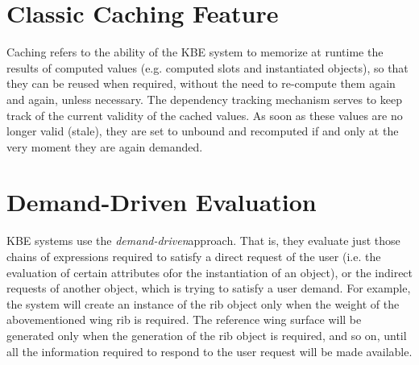 \documentclass [11pt]{book}
\begin{document}
\section{Classic Caching Feature}

\label{sec:classiccachingfeature}



Caching refers to the ability of the KBE system to memorize at
runtime the results of computed values (e.g. computed slots and
instantiated objects), so that they can be reused when required,
without the need to re-compute them again and again, unless necessary.
The dependency tracking mechanism serves to keep track of the current
validity of the cached values.  As soon as these values are no longer
valid (stale), they are set to unbound and recomputed if and only at
the very moment they are again demanded.



\section{Demand-Driven Evaluation}

\label{sec:demand-drivenevaluation}

KBE systems use the \emph{demand-driven}approach. That is, they evaluate just those chains of
expressions required to satisfy a direct request of the user (i.e. the
evaluation of certain attributes ofor the instantiation of an object),
or the indirect requests of another object, which is trying to satisfy
a user demand. For example, the system will create an instance of the
rib object only when the weight of the abovementioned wing rib is
required. The reference wing surface will be generated only when the
generation of the rib object is required, and so on, until all the
information required to respond to the user request will be made
available.
\end{document}
